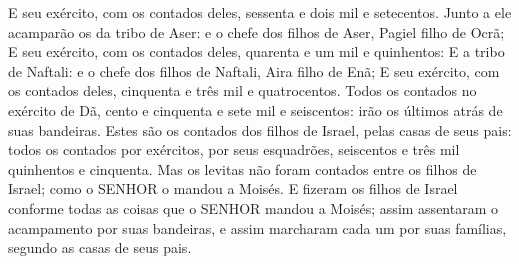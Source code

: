 {{  E seu exército, com os contados deles, sessenta e dois mil e setecentos.
  Junto a ele acamparão os da tribo de Aser: e o chefe dos filhos de Aser, Pagiel filho de Ocrã;
  E seu exército, com os contados deles, quarenta e um mil e quinhentos:
  E a tribo de Naftali: e o chefe dos filhos de Naftali, Aira filho de Enã;
  E seu exército, com os contados deles, cinquenta e três mil e quatrocentos.
  Todos os contados no exército de Dã, cento e cinquenta e sete mil e seiscentos: irão os últimos atrás de suas bandeiras}. %
  Estes são os contados dos filhos de Israel, pelas casas de seus pais: todos os contados por exércitos, por seus esquadrões, seiscentos e três mil quinhentos e cinquenta.
  Mas os levitas não foram contados entre os filhos de Israel; como o SENHOR o mandou a Moisés.
  E fizeram os filhos de Israel conforme todas as coisas que o SENHOR mandou a Moisés; assim assentaram o acampamento por suas bandeiras, e assim marcharam cada um por suas famílias, segundo as casas de seus pais.
\par }

